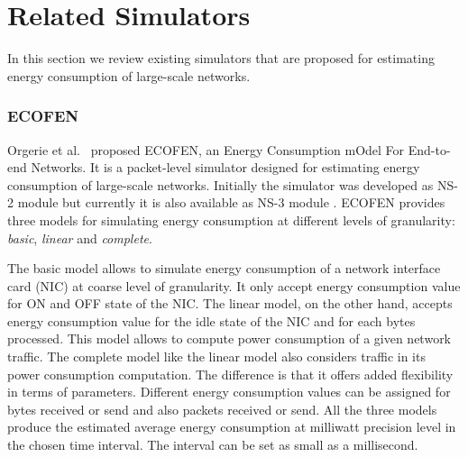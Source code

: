 \section{Related Simulators}
\label{section:relatedsimulator} 
In this section we review existing simulators that are proposed for estimating energy consumption of large-scale networks. 
\subsubsection{ECOFEN}
\label{subsection:ecofen} 
Orgerie et al.{\ }\cite{DBLP:conf/wowmom/OrgerieLLL11} proposed ECOFEN, an Energy Consumption
mOdel For End-to-end Networks. It is a packet-level simulator designed for estimating energy consumption of large-scale networks. Initially the simulator was developed as NS-2 module but currently it is also available as NS-3 module \cite{DBLP:conf/cloudnet/CorneaOL14}. ECOFEN provides three models for simulating energy consumption at different levels of granularity: \emph{basic}, \emph{linear} and \emph{complete}.

The basic model allows to simulate energy consumption of a network interface card (NIC) at coarse level of granularity. It only accept energy consumption value for ON and OFF state of the NIC. The linear model, on the other hand, accepts energy consumption value for the idle state of the NIC and for each bytes processed. This model allows to compute power consumption of a given network traffic. The complete model like the linear model also considers traffic in its power consumption computation. The difference is that it offers added flexibility in terms of parameters. Different energy consumption values can be assigned for bytes received or send and also packets received or send. All the three models produce the estimated average energy consumption at milliwatt precision level in the chosen time interval. The interval can be set as small as a millisecond. 



